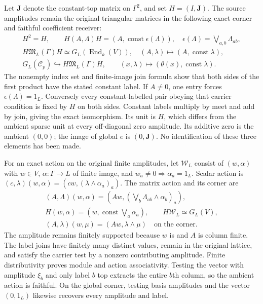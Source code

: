 Let $\mathbf J$ denote the constant-top matrix
on $\Gamma^2$, and set $H=(I,\mathbf J)$.
The source amplitudes remain the original
triangular matrices in the following exact
corner and faithful coefficient receiver:
\begin{equation}\tag{CFP40}
\begin{gathered}
 H^2=H,\qquad
 H(A,\Lambda)H=(A,\operatorname{const}\epsilon(\Lambda)),
        \quad\epsilon(\Lambda)=\bigvee_{a,b}\Lambda_{ab},\\
 H\mathfrak M_L(\Gamma)H
       \simeq G_L(\operatorname{End}_k(V)),\quad
           (A,\lambda)\longmapsto(A,\operatorname{const}\lambda),\\
 G_L(\mathcal C_p)\hookrightarrow H\mathfrak M_L(\Gamma)H,
           \qquad(x,\lambda)\longmapsto
                         (\theta(x),\operatorname{const}\lambda).
\end{gathered}
\end{equation}
The nonempty index set and finite-image
join formula show that both sides of the
first product have the stated constant
label. If $A\ne0$, one entry forces
$\epsilon(\Lambda)=1_L$. Conversely every
constant-labelled pair obeying that carrier
condition is fixed by $H$ on both sides.
Constant labels multiply by meet and add
by join, giving the exact isomorphism.
Its unit is $H$, which differs from the
ambient sparse unit at every off-diagonal
zero amplitude. Its additive zero is the
ambient $(0,0)$; the image of global $e$
is $(0,\mathbf J)$. No identification of
these three elements has been made.

For an exact action on the original finite
amplitudes, let $\mathcal W_L$ consist of
$(w,\alpha)$ with $w\in V$, $\alpha:\Gamma\to L$
of finite image, and
$w_a\ne0\Rightarrow\alpha_a=1_L$.
Scalar action is $(c,\lambda)(w,\alpha)
=(cw,(\lambda\wedge\alpha_a)_a)$.
The matrix action and its corner are
\begin{equation}\tag{CFP41}
\begin{gathered}
 (A,\Lambda)(w,\alpha)
    =\left(Aw,\left(\bigvee_b\Lambda_{ab}\wedge\alpha_b\right)_a\right),\\
 H(w,\alpha)=(w,\operatorname{const}\bigvee_a\alpha_a),\qquad
 H\mathcal W_L\simeq G_L(V),\\
 (A,\lambda)(w,\mu)=(Aw,\lambda\wedge\mu)
                         \quad\text{on the corner}.
\end{gathered}
\end{equation}
The amplitude remains finitely supported
because $w$ is and $A$ is column finite.
The label joins have finitely many distinct
values, remain in the original lattice,
and satisfy the carrier test by a nonzero
contributing amplitude. Finite distributivity
proves module and action associativity.
Testing the vector with amplitude $\xi_b$
and only label $b$ top extracts the entire
$b$th column, so the ambient action is
faithful. On the global corner, testing
basis amplitudes and the vector $(0,1_L)$
likewise recovers every amplitude and label.

